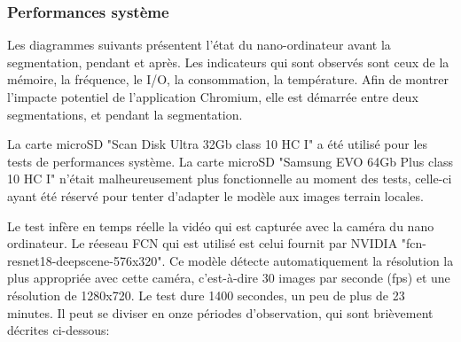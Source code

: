 \subsubsection{Performances système}
\par Les diagrammes suivants présentent l'état du nano-ordinateur avant la segmentation, pendant et après. Les indicateurs qui sont observés sont ceux de la mémoire, la fréquence, le I/O, la consommation, la température. Afin de montrer l'impacte potentiel de l'application Chromium, elle est démarrée entre deux segmentations, et pendant la segmentation. 
\par La carte microSD "Scan Disk Ultra 32Gb class 10 HC I" a été utilisé pour les tests de performances système. La carte microSD "Samsung EVO 64Gb Plus class 10 HC I" n'était malheureusement plus fonctionnelle au moment des tests, celle-ci ayant été réservé pour tenter d'adapter le modèle aux images terrain locales. 
\par Le test infère en temps réelle la vidéo qui est capturée avec la caméra du nano ordinateur. Le réeseau FCN qui est utilisé est celui fournit par NVIDIA "fcn-resnet18-deepscene-576x320". Ce modèle détecte automatiquement la résolution la plus appropriée avec cette caméra, c'est-à-dire 30 images par seconde (\acrshort{fps}) et une résolution de 1280x720. Le test dure 1400 secondes, un peu de plus de 23 minutes. Il peut se diviser en onze périodes d'observation, qui sont brièvement décrites ci-dessous: 
